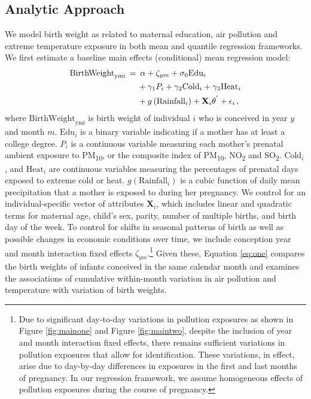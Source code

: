 \subsection{Analytic Approach\label{analytic-approach}}

We model birth weight as related to maternal education, air pollution and extreme
temperature exposure in both mean and quantile regression frameworks. We
first estimate a baseline main effects (conditional) mean regression model:
\begin{align}
\label{eq:one}
\begin{split}
\text{BirthWeight}_{\text{ymi}}\thinspace=&\thinspace\thinspace\thinspace 
\alpha + \zeta_{ym} + \sigma_{0}\text{Edu}_{i}\\
&\thinspace 
+ \gamma_{1}P_{i} + \gamma_{2}\text{Cold}_{i} + \gamma_{3}\text{Heat}_{i}\\
&\thinspace
+ g\left( \text{Rainfall}_{i} \right) + \mathbf{X}_{i}\mathbf{\theta}^{'} + \epsilon_{i}
\thinspace,\\
\end{split}
\end{align}
where \(\text{BirthWeight}_{\text{ymi}}\) is birth weight of individual
\(i\) who is conceived in year \(y\) and month \(m\). \(\text{Edu}_{i}\)
is a binary variable indicating if a mother has at least a college degree.
\(P_{i}\) is a continuous variable measuring each mother's prenatal
ambient exposure to PM\textsubscript{10}, or the composite index of
PM\textsubscript{10}, NO\textsubscript{2} and SO\textsubscript{2}.
\(\text{Cold}_{i}\), and \(\text{Heat}_{i}\) are continuous variables
measuring the percentages of prenatal days exposed to extreme cold or
heat. \(g\left( \text{Rainfall}_{i} \right)\) is a cubic function of
daily mean precipitation that a mother is exposed to during her
pregnancy. We control for an individual-specific vector of
attributes \(\boldsymbol{X}_{i}\), which includes linear and quadratic terms for
maternal age, child's sex, parity,  number of
multiple births, and birth day of the week. To control for shifts in
seasonal patterns of birth as well as possible changes in economic conditions over time, we include
conception year and month interaction fixed effects
\(\zeta_{ym}\).\footnote{Due to significant day-to-day variations in pollution exposures as shown in Figure \ref{fig:mainone} and Figure \ref{fig:maintwo}, despite the inclusion of year and month interaction fixed effects, there remains sufficient variations in pollution exposures that allow for identification. These variations, in effect, arise due to day-by-day differences in exposures in the first and last months of pregnancy. In our regression framework, we assume homogeneous effects of pollution exposures during the course of pregnancy.} Given these, Equation \eqref{eq:one} compares the birth
weights of infants conceived in the same calendar month and examines the
associations of cumulative within-month variation in air pollution and
temperature with variation of birth weights.

